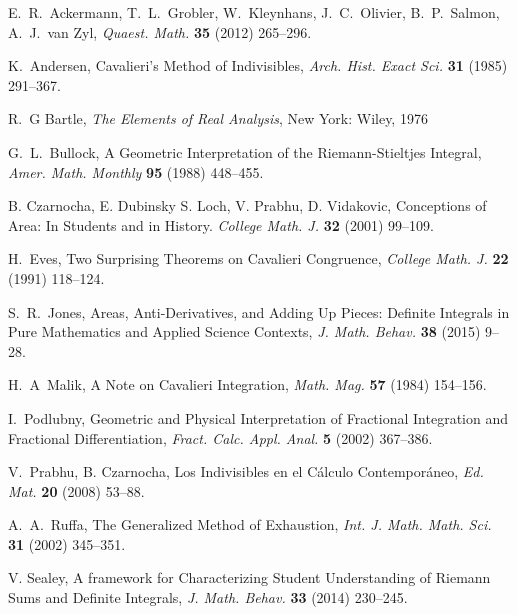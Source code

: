 \documentclass{article}
\theoremstyle{theorem}
\theoremstyle{definition}
\begin{document}

\begin{thebibliography}{10}
E.~R.~Ackermann, T.~L.~Grobler, W.~Kleynhans, J.~C.~Olivier, B.~P.~Salmon, A.~J.~van Zyl, \emph{Quaest. Math.} \textbf{35} (2012) 265--296. 

K.~Andersen, Cavalieri's Method of Indivisibles, \emph{Arch. Hist. Exact Sci.} \textbf{31} (1985) 291--367.

R.~G Bartle, \emph{The Elements of Real Analysis}, New York: Wiley, 1976

G.~L.~Bullock, A Geometric Interpretation of the Riemann-Stieltjes Integral, \emph{Amer. Math. Monthly} \textbf{95} (1988) 448--455. 

 B. Czarnocha, E. Dubinsky S. Loch, V. Prabhu, D. Vidakovic, Conceptions of Area: In Students and in History. \emph{College Math. J.} \textbf{32} (2001) 99--109.

H.~Eves, Two Surprising Theorems on Cavalieri Congruence, \emph{College Math. J.} \textbf{22} (1991) 118--124.

S.~R.~Jones, Areas, Anti-Derivatives, and Adding Up Pieces: Definite Integrals in Pure Mathematics and Applied Science Contexts, \emph{J. Math. Behav.}
\textbf{38} (2015) 9--28.

H.~A~Malik, A Note on Cavalieri Integration, \emph{Math. Mag.} \textbf{57} (1984) 154--156.

I.~Podlubny, Geometric and Physical Interpretation of Fractional Integration and Fractional Differentiation, \emph{Fract. Calc. Appl. Anal.} 
\textbf{5} (2002) 367--386.

V.~Prabhu, B. Czarnocha, Los Indivisibles en el C\'{a}lculo Contempor\'{a}neo, \emph{Ed. Mat.} \textbf{20} (2008) 53--88.

A.~A.~Ruffa, The Generalized Method of Exhaustion, \emph{Int. J. Math. Math. Sci.} \textbf{31} (2002) 345--351.

V. Sealey, A framework for Characterizing Student Understanding of Riemann Sums and Definite Integrals, \emph{J. Math. Behav.}  \textbf{33} (2014) 230--245.


\end{thebibliography}
\end{document}
